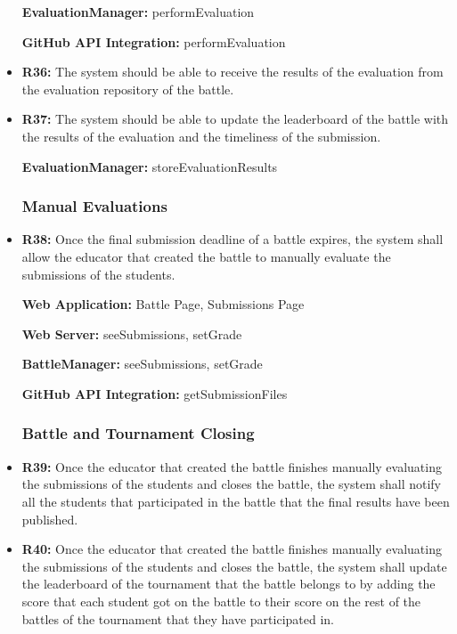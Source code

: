 \documentclass{article}
\begin{document}
\begin{itemize}
    \textbf{EvaluationManager:} performEvaluation

    \textbf{GitHub API Integration:} performEvaluation

    \item \textbf{R36:} The system should be able to receive the results of the evaluation from the evaluation repository of the battle.
    \item \textbf{R37:} The system should be able to update the leaderboard of the battle with the results of the evaluation and the timeliness of the submission.
    
    \textbf{EvaluationManager:} storeEvaluationResults
    
    \subsubsection*{Manual Evaluations}

    \item \textbf{R38:} Once the final submission deadline of a battle expires, the system shall allow the educator that created the battle to manually evaluate the submissions of the students.
    
    \textbf{Web Application:} Battle Page, Submissions Page

    \textbf{Web Server:} seeSubmissions, setGrade

    \textbf{BattleManager:} seeSubmissions, setGrade

    \textbf{GitHub API Integration:} getSubmissionFiles
    
    \subsubsection*{Battle and Tournament Closing}

    \item \textbf{R39:} Once the educator that created the battle finishes manually evaluating the submissions of the students and closes the battle, the system shall notify all the students that participated in the battle that the final results have been published.
    \item \textbf{R40:} Once the educator that created the battle finishes manually evaluating the submissions of the students and closes the battle, the system shall update the leaderboard of the tournament that the battle belongs to by adding the score that each student got on the battle to their score on the rest of the battles of the tournament that they have participated in.
    

\end{itemize}
\end{document}
